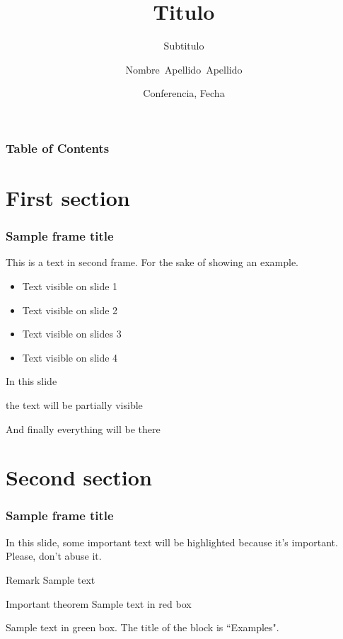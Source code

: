\documentclass{beamer}
\title[Titulo corredero] %
{Titulo}
\subtitle{Subtitulo}
\author[Nombre autor, Otro autor] %
{Nombre~Apellido~Apellido\inst{1} 
}
\institute[Universidad de Almería
] %
{
  \inst{1}%
  Departmento\\
  Universidad de Almería
}
\date[confdate] %
{Conferencia, Fecha}
\begin{document}
\frame{\titlepage}


\begin{frame}
\frametitle{Table of Contents}
\tableofcontents
\end{frame}


\section{First section}

\begin{frame}
\frametitle{Sample frame title}
This is a text in second frame. For the sake of showing an example.

\begin{itemize}
    \item<1-> Text visible on slide 1
    \item<2-> Text visible on slide 2
    \item<3> Text visible on slides 3
    \item<4-> Text visible on slide 4
\end{itemize}
\end{frame}



\begin{frame}
In this slide \pause

the text will be partially visible \pause

And finally everything will be there
\end{frame}

\section{Second section}

\begin{frame}
\frametitle{Sample frame title}

In this slide, some important text will be
\alert{highlighted} because it's important.
Please, don't abuse it.

\begin{block}{Remark}
Sample text
\end{block}

\begin{alertblock}{Important theorem}
Sample text in red box
\end{alertblock}

\begin{examples}
Sample text in green box. The title of the block is ``Examples".
\end{examples}
\end{frame}
\end{document}
